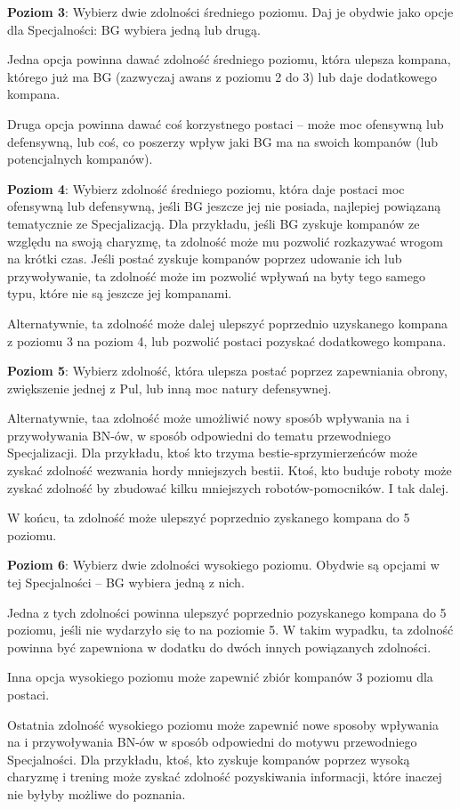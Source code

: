 \textbf{Poziom 3}: Wybierz dwie zdolności średniego poziomu. Daj je obydwie jako opcje dla Specjalności: BG wybiera jedną lub drugą.

Jedna opcja powinna dawać zdolność średniego poziomu, która ulepsza kompana, którego już ma BG (zazwyczaj awans z poziomu 2 do 3) lub daje dodatkowego kompana.

Druga opcja powinna dawać coś korzystnego postaci – może moc ofensywną lub defensywną, lub coś, co poszerzy wpływ jaki BG ma na swoich kompanów (lub potencjalnych kompanów).

\textbf{Poziom 4}: Wybierz zdolność średniego poziomu, która daje postaci moc ofensywną lub defensywną, jeśli BG jeszcze jej nie posiada, najlepiej powiązaną tematycznie ze Specjalizacją. Dla przykładu, jeśli BG zyskuje kompanów ze względu na swoją charyzmę, ta zdolność może mu pozwolić rozkazywać wrogom na krótki czas. Jeśli postać zyskuje kompanów poprzez udowanie ich lub przywoływanie, ta zdolność może im pozwolić wpływań na byty tego samego typu, które nie są jeszcze jej kompanami.

Alternatywnie, ta zdolność może dalej ulepszyć poprzednio uzyskanego kompana z poziomu 3 na poziom 4, lub pozwolić postaci pozyskać dodatkowego kompana.

\textbf{Poziom 5}: Wybierz zdolność, która ulepsza postać poprzez zapewniania obrony, zwiększenie jednej z Pul, lub inną moc natury defensywnej.

Alternatywnie, taa zdolność może umożliwić nowy sposób wpływania na i przywoływania BN-ów, w sposób odpowiedni do tematu przewodniego Specjalizacji. Dla przykładu, ktoś kto trzyma bestie-sprzymierzeńców może zyskać zdolność wezwania hordy mniejszych bestii. Ktoś, kto buduje roboty może zyskać zdolność by zbudować kilku mniejszych robotów-pomocników. I tak dalej.

W końcu, ta zdolność może ulepszyć poprzednio zyskanego kompana do 5 poziomu.

\textbf{Poziom 6}: Wybierz dwie zdolności wysokiego poziomu. Obydwie są opcjami w tej Specjalności – BG wybiera jedną z nich.

Jedna z tych zdolności powinna ulepszyć poprzednio pozyskanego kompana do 5 poziomu, jeśli nie wydarzyło się to na poziomie 5. W takim wypadku, ta zdolność powinna być zapewniona w dodatku do dwóch innych powiązanych zdolności.

Inna opcja wysokiego poziomu może zapewnić zbiór kompanów 3 poziomu dla postaci.

Ostatnia zdolność wysokiego poziomu może zapewnić nowe sposoby wpływania na i przywoływania BN-ów w sposób odpowiedni do motywu przewodniego Specjalności. Dla przykładu, ktoś, kto zyskuje kompanów poprzez wysoką charyzmę i trening może zyskać zdolność pozyskiwania informacji, które inaczej nie byłyby możliwe do poznania.

